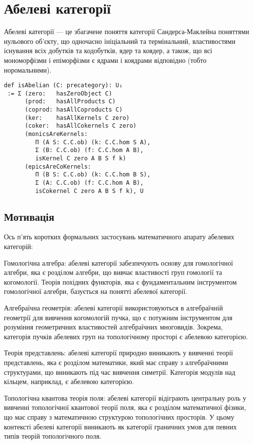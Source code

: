\section{Абелеві категорії}

Абелеві категорії --- це збагачене поняття категорії Сандерса-Маклейна
поняттями нульового об'єкту, що одночасно ініціальний та термінальний,
властивостями існування всіх добутків та кодобутків, ядер та коядер,
а також, що всі мономорфізми і епіморфізми є ядрами і коядрами відповідно (тобто норомальними).

\begin{lstlisting}
def isAbelian (C: precategory): U₁
 := Σ (zero:   hasZeroObject C)
      (prod:   hasAllProducts C)
      (coprod: hasAllCoproducts C)
      (ker:    hasAllKernels C zero)
      (coker:  hasAllCokernels C zero)
      (monicsAreKernels:
         Π (A S: C.C.ob) (k: C.C.hom S A),
         Σ (B: C.C.ob) (f: C.C.hom A B),
         isKernel C zero A B S f k)
      (epicsAreCoKernels:
         Π (B S: C.C.ob) (k: C.C.hom B S),
         Σ (A: C.C.ob) (f: C.C.hom A B),
         isCokernel C zero A B S f k), U
\end{lstlisting}    

\subsection*{Мотивація}

Ось п'ять коротких формальних застосувань математичного
апарату абелевих категорій:

Гомологічна алгебра: абелеві категорії забезпечують основу для
гомологічної алгебри, яка є розділом алгебри, що вивчає властивості
груп гомології та когомології. Теорія похідних функторів, яка є
фундаментальним інструментом гомологічної алгебри, базується на
понятті абелевої категорії.

Алгебраїчна геометрія: абелеві категорії використовуються в
алгебраїчній геометрії для вивчення когомологій пучка, що є
потужним інструментом для розуміння геометричних властивостей
алгебраїчних многовидів. Зокрема, категорія пучків абелевих груп
на топологічному просторі є абелевою категорією.

Теорія представлень: абелеві категорії природно виникають у
вивченні теорії представлень, яка є розділом математики, який
має справу з алгебраїчними структурами, що виникають під час
вивчення симетрії. Категорія модулів над кільцем, наприклад, є абелевою категорією.

Топологічна квантова теорія поля: абелеві категорії відіграють
центральну роль у вивченні топологічної квантової теорії поля,
яка є розділом математичної фізики, що має справу з математичною
структурою топологічних просторів. У цьому контексті абелеві
категорії виникають як категорії граничних умов для певних
типів теорій топологічного поля.

